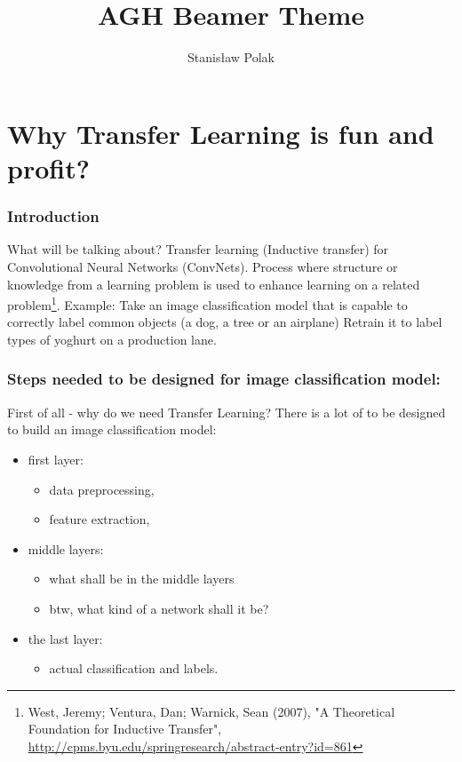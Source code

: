\documentclass[aspectratio=1610,english]{beamer} %
\title{AGH Beamer Theme}
\author{Stanisław Polak\inst{1,2}}
\date{}
\institute[AGH]{
	\inst{1}Institute of Computer Science\\ul. Kawiory 21\\30-055 Kraków\\
	Poland\\
	\url{http://www.icsr.agh.edu.pl/~polak/}
\and
	\inst{2}Second affiliation
}
\begin{document}
  	\maketitle
	\part{Why Transfer Learning is fun and profit?}
	\section{Introduction}
		\begin{frame}{What will be talking about?}
			Transfer learning (Inductive transfer) for Convolutional Neural Networks (ConvNets). 
			\newline
			\newline
			Process where structure or knowledge from a learning problem is used to enhance learning on a related problem\footnote{West, Jeremy; Ventura, Dan; Warnick, Sean (2007), "A Theoretical Foundation for Inductive Transfer", \url{http://cpms.byu.edu/springresearch/abstract-entry?id=861}}. 
			\newline
			\newline
			Example: \newline
			Take an image classification model that is capable to correctly label common objects (a dog, a tree or an airplane)
			\newline 
			Retrain it to label types of yoghurt on a production lane.
		\end{frame}
	
	\section{Steps needed to be designed for image classification model:}
	\begin{frame}{First of all - why do we need Transfer Learning?}
		There is a lot of to be designed to build an image classification model:
		\begin{itemize}
			\item first layer:
			\begin{itemize}
				\item data preprocessing,
				\item feature extraction,
			\end{itemize}

		\item middle layers:
			\begin{itemize}
				\item what shall be in the middle layers
				\item btw, what kind of a network shall it be?
			\end{itemize}
		
		\item the last layer:
			\begin{itemize}
				\item actual classification and labels.
			\end{itemize}
		\end{itemize}
	 \end{frame}
 
\end{document}
